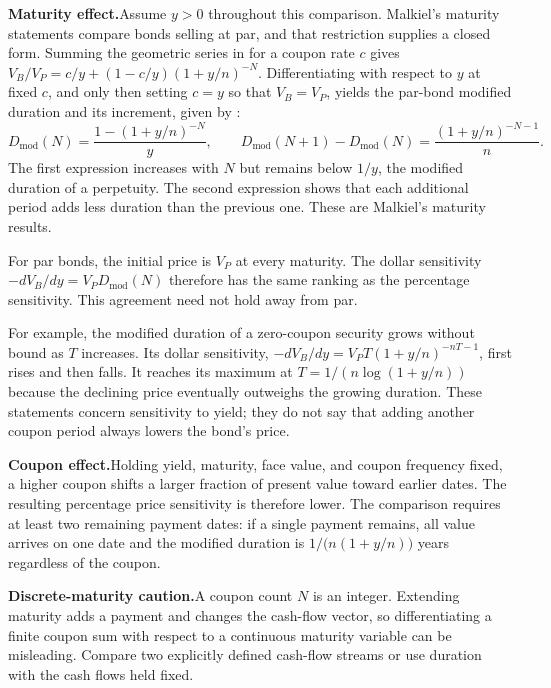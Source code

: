 \documentclass[11pt]{article}
\newcommand{\B}{V_{B}}
\begin{document}
\textbf{Maturity effect.}\enspace Assume $y>0$ throughout this comparison. Malkiel's maturity statements compare bonds selling at par, and that restriction supplies a closed form. Summing the geometric series in  for a coupon rate $c$ gives $\B/V_P=c/y+(1-c/y)\left(1+y/n\right)^{-N}$. Differentiating with respect to $y$ at fixed $c$, and only then setting $c=y$ so that $\B=V_P$, yields the par-bond modified duration and its increment, given by :
\begin{equation}
  \label{eq:par-duration}
  D_{\mathrm{mod}}(N)=\frac{1-\left(1+y/n\right)^{-N}}{y},
  \qquad
  D_{\mathrm{mod}}(N+1)-D_{\mathrm{mod}}(N)=\frac{\left(1+y/n\right)^{-N-1}}{n}.
\end{equation}
The first expression increases with $N$ but remains below $1/y$, the modified duration of a perpetuity. The second expression shows that each additional period adds less duration than the previous one. These are Malkiel's maturity results.

For par bonds, the initial price is $V_P$ at every maturity. The dollar sensitivity $-d\B/dy=V_PD_{\mathrm{mod}}(N)$ therefore has the same ranking as the percentage sensitivity. This agreement need not hold away from par.

For example, the modified duration of a zero-coupon security grows without bound as $T$ increases. Its dollar sensitivity, $-d\B/dy=V_PT\left(1+y/n\right)^{-nT-1}$, first rises and then falls. It reaches its maximum at $T=1/\left(n\log\left(1+y/n\right)\right)$ because the declining price eventually outweighs the growing duration. These statements concern sensitivity to yield; they do not say that adding another coupon period always lowers the bond's price.

\textbf{Coupon effect.}\enspace Holding yield, maturity, face value, and coupon frequency fixed, a higher coupon shifts a larger fraction of present value toward earlier dates. The resulting percentage price sensitivity is therefore lower. The comparison requires at least two remaining payment dates: if a single payment remains, all value arrives on one date and the modified duration is $1/\bigl(n(1+y/n)\bigr)$ years regardless of the coupon.

\textbf{Discrete-maturity caution.}\enspace A coupon count $N$ is an integer. Extending maturity adds a payment and changes the cash-flow vector, so differentiating a finite coupon sum with respect to a continuous maturity variable can be misleading. Compare two explicitly defined cash-flow streams or use duration with the cash flows held fixed.
\end{document}
